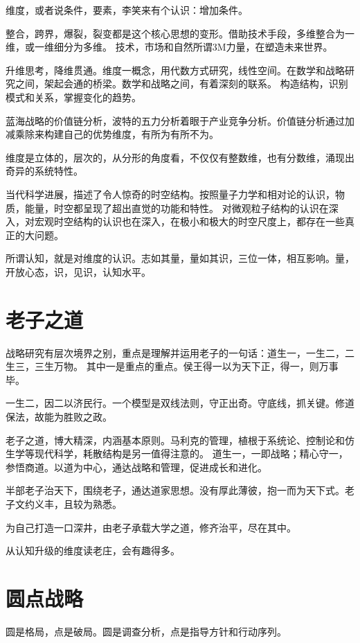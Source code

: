 维度，或者说条件，要素，李笑来有个认识：增加条件。

整合，跨界，爆裂，裂变都是这个核心思想的变形。借助技术手段，多维整合为一维，或一维细分为多维。
技术，市场和自然所谓3M力量，在塑造未来世界。

升维思考，降维贯通。维度一概念，用代数方式研究，线性空间。在数学和战略研究之间，架起会通的桥梁。数学和战略之间，有着深刻的联系。
构造结构，识别模式和关系，掌握变化的趋势。

蓝海战略的价值链分析，波特的五力分析着眼于产业竞争分析。价值链分析通过加减乘除来构建自己的优势维度，有所为有所不为。

维度是立体的，层次的，从分形的角度看，不仅仅有整数维，也有分数维，涌现出奇异的系统特性。

当代科学进展，描述了令人惊奇的时空结构。按照量子力学和相对论的认识，物质，能量，时空都呈现了超出直觉的功能和特性。
对微观粒子结构的认识在深入，对宏观时空结构的认识也在深入，在极小和极大的时空尺度上，都存在一些真正的大问题。

所谓认知，就是对维度的认识。志如其量，量如其识，三位一体，相互影响。量，开放心态，识，见识，认知水平。

\section{老子之道}

战略研究有层次境界之别，重点是理解并运用老子的一句话：道生一，一生二，二生三，三生万物。
其中一是重点的重点。侯王得一以为天下正，得一，则万事毕。

一生二，因二以济民行。一个模型是双线法则，守正出奇。守底线，抓关键。修道保法，故能为胜败之政。

老子之道，博大精深，内涵基本原则。马利克的管理，植根于系统论、控制论和仿生学等现代科学，耗散结构是另一值得注意的。
道生一，一即战略；精心守一，参悟商道。以道为中心，通达战略和管理，促进成长和进化。

半部老子治天下，围绕老子，通达道家思想。没有厚此薄彼，抱一而为天下式。老子文约义丰，且较为熟悉。

为自己打造一口深井，由老子承载大学之道，修齐治平，尽在其中。

从认知升级的维度读老庄，会有趣得多。

\section{圆点战略}

圆是格局，点是破局。圆是调查分析，点是指导方针和行动序列。

